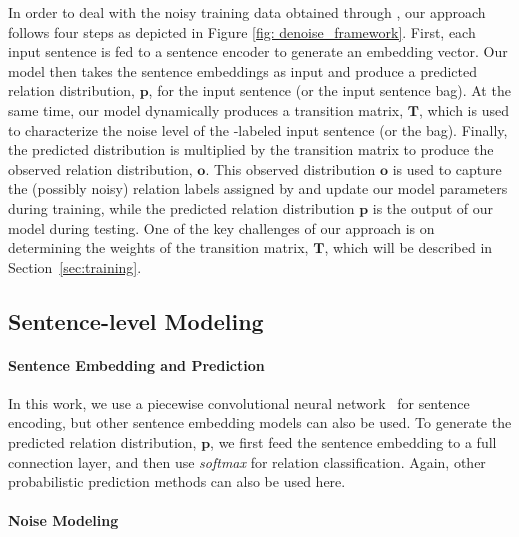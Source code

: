 In order to deal with the noisy training data obtained through \DS, our approach follows four steps as depicted in Figure \ref{fig: denoise_framework}.
First, each input sentence is fed to a sentence encoder to generate an embedding vector. Our model then takes the sentence embeddings as input and produce a predicted relation
distribution, $\mathbf{p}$, for the input sentence (or the input sentence bag). At the same time, our model dynamically produces
a transition matrix, $\mathbf{T}$, which is used to characterize the noise level of the \DS-labeled input sentence (or the
bag). Finally, the predicted distribution is multiplied by the transition matrix to produce the observed relation
distribution, $\mathbf{o}$. This observed distribution $\mathbf{o}$ is used to capture the (possibly noisy) relation labels
assigned by \DS and update our model parameters during training, while the predicted relation distribution $\mathbf{p}$ is
the output of our model during testing.
One of the key challenges of our approach is
on determining the weights of the transition matrix, $\mathbf{T}$, which will be described in Section~\ref{sec:training}.



\subsection{Sentence-level Modeling}

\paragraph{Sentence Embedding and Prediction}
 In this work, we use a piecewise convolutional neural network~\cite{zeng2015distant} for sentence encoding, but other sentence embedding models can also be used.
To generate the predicted relation distribution, $\mathbf{p}$,  we first feed the sentence embedding to a full connection layer, and then use \emph{softmax} for
relation classification. Again, other probabilistic prediction methods can also be used here.

\paragraph{Noise Modeling}

